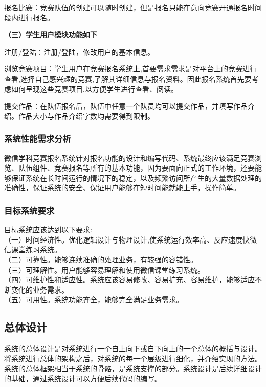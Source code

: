 \documentclass[a4paper]{ltxdoc}
\begin{document}
{		报名比赛：竞赛队伍的创建可以随时创建，但是报名只能在意向竞赛开通报名时间段内进行报名。
		
		\textbf{（三）学生用户模块功能如下}
		
		注册/登陆：注册/登陆，修改用户的基本信息。
		
		浏览竞赛项目：学生用户在竞赛报名系统上,首要需求需求是对平台上的竞赛进行查看,选择自己感兴趣的竞赛,了解其详细信息与报名资料。因此报名系统首先要考虑如何呈现这些竞赛项目,以方便学生进行查看、阅读。
		
		提交作品：在队伍报名后，队伍中任意一个队员均可以提交作品，并填写作品介绍。作品大小与作品介绍字数均需要得到限制。
		
		\subsubsection{系统性能需求分析}
		微信学科竞赛报名系统针对报名功能的设计和编写代码、系统最终应该满足竞赛浏览、队伍组件、竞赛报名等所有的基本功能，因为要面向正式的工作环境，还要能够保证系统在长时间运行的情况下的稳定，以及频繁访问所产生的大量数据处理的准确性，保证系统的安全、保证用户能够在短时间能就能上手，操作简单。 
		
		\subsubsection{目标系统要求}
		目标系统应该达到以下要求: \\
		（一）时间经济性。优化逻辑设计与物理设计,使系统运行效率高、反应速度快微信课堂练习系统。\\
		（二）可靠性。能够连续准确的处理业务，有较强的容错性。\\
		（三）可理解性。用户能够容易理解和使用微信课堂练习系统。\\
		（四）可维护性和适应性。系统应该容易修改、容易扩充、容易维护，能够适应不断变化的业务需求。\\
		（五）可用性。系统功能齐全，能够完全满足业务需求。\\
		
		\subsection{总体设计}
		系统的总体设计是对系统进行一个自上向下或自下向上的一个总体的概括与设计。将系统进行总体的架构之后，对系统的每一个层级进行细化，并介绍实现的方法。系统的总体框架相当于系统的骨骼，是系统支撑的部分。系统设计是后续详细设计的基础，通过系统设计可以方便后续代码的编写。 
		
}
\end{document}
